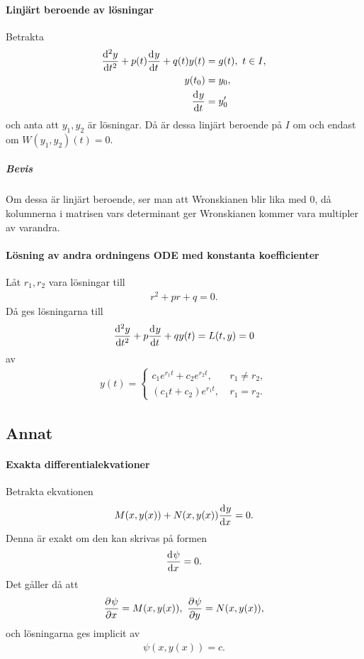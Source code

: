 \paragraph{Linjärt beroende av lösningar}
Betrakta
\begin{align*}
	\deval[2]{y}{t}{t} + p(t)\deval{y}{t}{t} + q(t)y(t) &= g(t),\ t\in I, \\
	y(t_0)                                              &= y_0, \\
	\deval{y}{t}{t_{0}}                                 &= y'_{0}
\end{align*}
och anta att $y_{1}, y_{2}$ är lösningar. Då är dessa linjärt beroende på $I$ om och endast om $W(y_{1}, y_{2})(t) = 0$.

\subparagraph{Bevis}
Om dessa är linjärt beroende, ser man att Wronskianen blir lika med $0$, då kolumnerna i matrisen vars determinant ger Wronskianen kommer vara multipler av varandra.

\paragraph{Lösning av andra ordningens ODE med konstanta koefficienter}
Låt $r_1, r_2$ vara lösningar till
\begin{align*}
	r^2 + pr + q = 0.
\end{align*}
Då ges lösningarna till
\begin{align*}
	\dv[2]{y}{t} (t) + p\dv[]{y}{t} (t) + qy(t) = L(t, y) = 0
\end{align*}
av
\begin{align*}
	y(t) = 
	\begin{cases}
		c_1e^{r_1t} + c_2e^{r_2t},\ &r_1\neq r_2, \\
		(c_1t + c_2)e^{r_1t},\      &r_1 = r_2.
	\end{cases}
\end{align*}

\subsection{Annat}

\paragraph{Exakta differentialekvationer}
Betrakta ekvationen
\begin{align*}
	M(x, y(x)) + N(x, y(x))\dv[]{y}{x} (x) = 0.
\end{align*}
Denna är exakt om den kan skrivas på formen
\begin{align*}
	\dv[]{\psi}{x} (x, y(x)) = 0.
\end{align*}
Det gåller då att
\begin{align*}
	\pdv[]{\psi}{x} (x, y(x)) = M(x, y(x)),\ \pdv[]{\psi}{y} (x, y(x)) = N(x, y(x)),
\end{align*}
och lösningarna ges implicit av
\begin{align*}
	\psi(x, y(x)) = c.
\end{align*}

